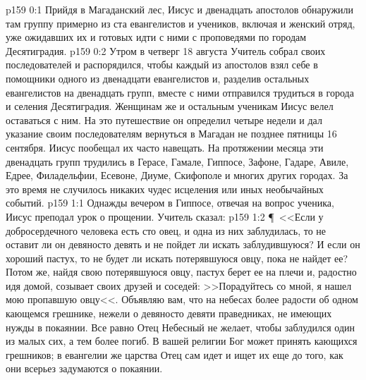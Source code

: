 \vs p159 0:1 Прийдя в Магаданский лес, Иисус и двенадцать апостолов обнаружили там группу примерно из ста евангелистов и учеников, включая и женский отряд, уже ожидавших их и готовых идти с ними с проповедями по городам Десятиградия.
\vs p159 0:2 Утром в четверг 18 августа Учитель собрал своих последователей и распорядился, чтобы каждый из апостолов взял себе в помощники одного из двенадцати евангелистов и, разделив остальных евангелистов на двенадцать групп, вместе с ними отправился трудиться в города и селения Десятиградия. Женщинам же и остальным ученикам Иисус велел оставаться с ним. На это путешествие он определил четыре недели и дал указание своим последователям вернуться в Магадан не позднее пятницы 16 сентября. Иисус пообещал их часто навещать. На протяжении месяца эти двенадцать групп трудились в Герасе, Гамале, Гиппосе, Зафоне, Гадаре, Авиле, Едрее, Филадельфии, Есевоне, Диуме, Скифополе и многих других городах. За это время не случилось никаких чудес исцеления или иных необычайных событий.
\vs p159 1:1 Однажды вечером в Гиппосе, отвечая на вопрос ученика, Иисус преподал урок о прощении. Учитель сказал:
\vs p159 1:2 \P\ <<Если у добросердечного человека есть сто овец, и одна из них заблудилась, то не оставит ли он девяносто девять и не пойдет ли искать заблудившуюся? И если он хороший пастух, то не будет ли искать потерявшуюся овцу, пока не найдет ее? Потом же, найдя свою потерявшуюся овцу, пастух берет ее на плечи и, радостно идя домой, созывает своих друзей и соседей: >>Порадуйтесь со мной, я нашел мою пропавшую овцу<<. Объявляю вам, что на небесах более радости об одном кающемся грешнике, нежели о девяносто девяти праведниках, не имеющих нужды в покаянии. Все равно Отец Небесный не желает, чтобы заблудился один из малых сих, а тем более погиб. В вашей религии Бог может принять кающихся грешников; в евангелии же царства Отец сам идет и ищет их еще до того, как они всерьез задумаются о покаянии.
